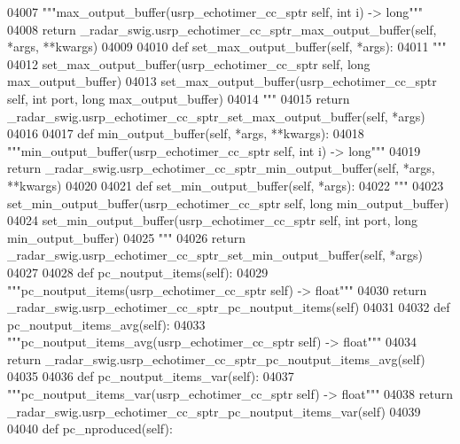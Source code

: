 \begin{DoxyCode}
{{{{{{{{{{{{{{04007         \textcolor{stringliteral}{"""max\_output\_buffer(usrp\_echotimer\_cc\_sptr self, int i) -> long"""}
04008         \textcolor{keywordflow}{return} \_radar\_swig.usrp\_echotimer\_cc\_sptr\_max\_output\_buffer(self, *args, **kwargs)
04009 
04010     \textcolor{keyword}{def }set_max_output_buffer(self, *args):
04011         \textcolor{stringliteral}{"""}
04012 \textcolor{stringliteral}{        set\_max\_output\_buffer(usrp\_echotimer\_cc\_sptr self, long max\_output\_buffer)}
04013 \textcolor{stringliteral}{        set\_max\_output\_buffer(usrp\_echotimer\_cc\_sptr self, int port, long max\_output\_buffer)}
04014 \textcolor{stringliteral}{        """}
04015         \textcolor{keywordflow}{return} \_radar\_swig.usrp\_echotimer\_cc\_sptr\_set\_max\_output\_buffer(self, *args)
04016 
04017     \textcolor{keyword}{def }min_output_buffer(self, *args, **kwargs):
04018         \textcolor{stringliteral}{"""min\_output\_buffer(usrp\_echotimer\_cc\_sptr self, int i) -> long"""}
04019         \textcolor{keywordflow}{return} \_radar\_swig.usrp\_echotimer\_cc\_sptr\_min\_output\_buffer(self, *args, **kwargs)
04020 
04021     \textcolor{keyword}{def }set_min_output_buffer(self, *args):
04022         \textcolor{stringliteral}{"""}
04023 \textcolor{stringliteral}{        set\_min\_output\_buffer(usrp\_echotimer\_cc\_sptr self, long min\_output\_buffer)}
04024 \textcolor{stringliteral}{        set\_min\_output\_buffer(usrp\_echotimer\_cc\_sptr self, int port, long min\_output\_buffer)}
04025 \textcolor{stringliteral}{        """}
04026         \textcolor{keywordflow}{return} \_radar\_swig.usrp\_echotimer\_cc\_sptr\_set\_min\_output\_buffer(self, *args)
04027 
04028     \textcolor{keyword}{def }pc_noutput_items(self):
04029         \textcolor{stringliteral}{"""pc\_noutput\_items(usrp\_echotimer\_cc\_sptr self) -> float"""}
04030         \textcolor{keywordflow}{return} \_radar\_swig.usrp\_echotimer\_cc\_sptr\_pc\_noutput\_items(self)
04031 
04032     \textcolor{keyword}{def }pc_noutput_items_avg(self):
04033         \textcolor{stringliteral}{"""pc\_noutput\_items\_avg(usrp\_echotimer\_cc\_sptr self) -> float"""}
04034         \textcolor{keywordflow}{return} \_radar\_swig.usrp\_echotimer\_cc\_sptr\_pc\_noutput\_items\_avg(self)
04035 
04036     \textcolor{keyword}{def }pc_noutput_items_var(self):
04037         \textcolor{stringliteral}{"""pc\_noutput\_items\_var(usrp\_echotimer\_cc\_sptr self) -> float"""}
04038         \textcolor{keywordflow}{return} \_radar\_swig.usrp\_echotimer\_cc\_sptr\_pc\_noutput\_items\_var(self)
04039 
04040     \textcolor{keyword}{def }pc_nproduced(self):
}}}}}}}}}}}}}}
\end{DoxyCode}
